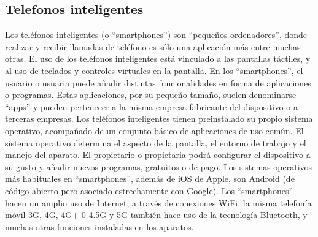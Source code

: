 \documentclass[]{article}
\begin{document}
\subsection{Telefonos inteligentes}
Los teléfonos inteligentes (o “smartphones”) son “pequeños ordenadores”, donde realizar y recibir llamadas de teléfono es sólo una aplicación más entre muchas otras. El uso de los teléfonos inteligentes está vinculado a las pantallas táctiles, y al uso de teclados y controles virtuales en la pantalla. En los “smartphones”, el usuario o usuaria puede añadir distintas funcionalidades en forma de aplicaciones o programas. Estas aplicaciones, por su pequeño tamaño, suelen denominarse “apps” y pueden pertenecer a la misma empresa fabricante del dispositivo o a terceras empresas. Los teléfonos inteligentes tienen preinstalado su propio sistema operativo, acompañado de un conjunto básico de aplicaciones de uso común. El sistema operativo determina el aspecto de la pantalla, el entorno de trabajo y el manejo del aparato. El propietario o propietaria podrá configurar el dispositivo a su gusto y añadir nuevos programas, gratuitos o de pago. Los sistemas operativos más habituales en “smartphones”, además de iOS de Apple, son Android (de código abierto pero asociado estrechamente con Google). Los “smartphones” hacen un amplio uso de Internet, a través de conexiones WiFi, la misma telefonía móvil 3G, 4G, 4G+ 0 4.5G y 5G también hace uso de la tecnología Bluetooth, y muchas otras funciones instaladas en los aparatos.
\end{document}
